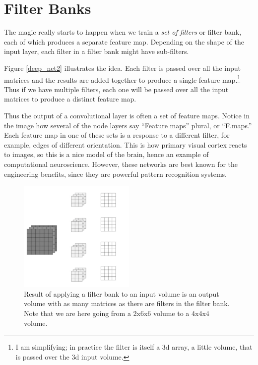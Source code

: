 
\section{Filter Banks}



The magic really starts to happen when we train a \emph{set of filters} or filter bank, each of which produces a separate feature map. Depending on the shape of the input layer, each filter in a filter bank might have sub-filters.

 Figure \ref{deep_net2} illustrates the idea. Each filter is passed over all the input matrices and the results are added together to produce a single feature map.\footnote{I am simplifying; in practice the filter is itself a 3d array, a little volume, that is passed over the 3d input volume.}  Thus if we have multiple filters, each one will be passed over all the input matrices to produce a distinct feature map.  

Thus the output of a convolutional layer is often a set of feature maps. Notice in the image how several of the node layers say ``Feature maps'' plural, or ``F.maps.'' Each feature map in one of these sets is a response to a different filter, for example, edges of different orientation. This is how primary visual cortex reacts to images, so this is a nice model of the brain, hence an example of computational  neuroscience. However, these networks are best known for the engineering benefits, since they are powerful pattern recognition systems.

\begin{figure}
\centering
\includegraphics[width=0.5\textwidth]{images/multipleFilters}
\caption[Jeff Yoshimi.]{Result of applying a filter bank to an input volume is an output volume with as many matrices as there are filters in the filter bank. Note that we are here going from a 2x6x6 volume to a 4x4x4 volume.}
\label{combing2}
\end{figure}

